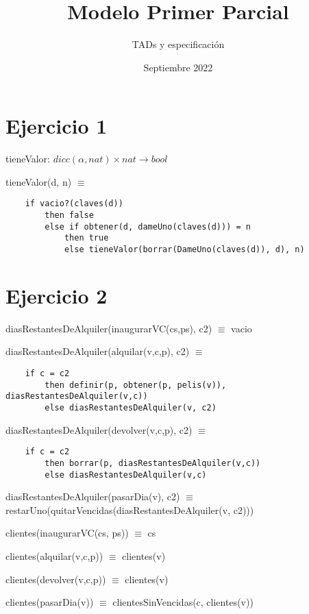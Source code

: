 
\setlength{\parindent}{0pt}

\title{Modelo Primer Parcial}
\author{TADs y especificación}
\date{Septiembre 2022}



\maketitle

\section{Ejercicio 1}

tieneValor: $dicc(\alpha, nat) \times nat \rightarrow bool$

tieneValor(d, n) $\equiv $
\begin{lstlisting}
    if vacio?(claves(d))
        then false
        else if obtener(d, dameUno(claves(d))) = n
            then true
            else tieneValor(borrar(DameUno(claves(d)), d), n)
\end{lstlisting}
\section{Ejercicio 2}

diasRestantesDeAlquiler(inaugurarVC(cs,ps), c2) $\equiv$ vacio

diasRestantesDeAlquiler(alquilar(v,c,p), c2) $\equiv$ 
\begin{lstlisting}
    if c = c2
        then definir(p, obtener(p, pelis(v)), diasRestantesDeAlquiler(v,c))
        else diasRestantesDeAlquiler(v, c2)
\end{lstlisting}

diasRestantesDeAlquiler(devolver(v,c,p), c2) $\equiv$ 
\begin{lstlisting}
    if c = c2
        then borrar(p, diasRestantesDeAlquiler(v,c))
        else diasRestantesDeAlquiler(v,c)
\end{lstlisting}

diasRestantesDeAlquiler(pasarDia(v), c2) $\equiv$ restarUno(quitarVencidas(diasRestantesDeAlquiler(v, c2)))

clientes(inaugurarVC(cs, ps)) $\equiv$ cs

clientes(alquilar(v,c,p)) $\equiv$ clientes(v)

clientes(devolver(v,c,p)) $\equiv$ clientes(v)

clientes(pasarDia(v)) $\equiv$ clientesSinVencidas(c, clientes(v))


